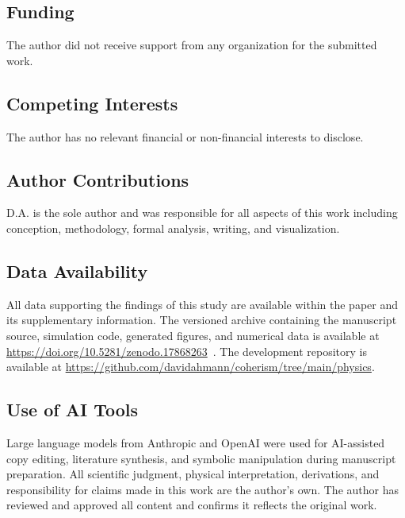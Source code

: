\documentclass[aps,prd,twocolumn,superscriptaddress,nofootinbib,floatfix]{revtex4-2}
\begin{document}
\subsection*{Funding}
The author did not receive support from any organization for the submitted work.

\subsection*{Competing Interests}
The author has no relevant financial or non-financial interests to disclose.

\subsection*{Author Contributions}
D.A. is the sole author and was responsible for all aspects of this work including conception, methodology, formal analysis, writing, and visualization.

\subsection*{Data Availability}
All data supporting the findings of this study are available within the paper and its supplementary information. The versioned archive containing the manuscript source, simulation code, generated figures, and numerical data is available at \url{https://doi.org/10.5281/zenodo.17868263}~\cite{AhmannZenodoCoherism2025}. The development repository is available at \url{https://github.com/davidahmann/coherism/tree/main/physics}.

\subsection*{Use of AI Tools}
Large language models from Anthropic and OpenAI were used for AI-assisted copy editing, literature synthesis, and symbolic manipulation during manuscript preparation. All scientific judgment, physical interpretation, derivations, and responsibility for claims made in this work are the author's own. The author has reviewed and approved all content and confirms it reflects the original work.



\end{document}

